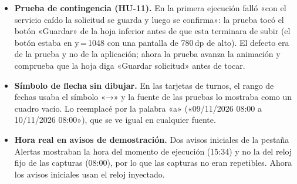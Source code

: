 \begin{itemize}
	\item \textbf{Prueba de contingencia (HU-11).} En la primera ejecución falló «con el servicio caído la solicitud se guarda y luego se confirma»: la prueba tocó el botón «Guardar» de la hoja inferior antes de que esta terminara de subir (el botón estaba en y\,=\,1048 con una pantalla de 780\,dp de alto). El defecto era de la prueba y no de la aplicación; ahora la prueba avanza la animación y comprueba que la hoja diga «Guardar solicitud» antes de tocar.
	\item \textbf{Símbolo de flecha sin dibujar.} En las tarjetas de turnos, el rango de fechas usaba el símbolo «→» y la fuente de las pruebas lo mostraba como un cuadro vacío. Lo reemplacé por la palabra «a» («09/11/2026 08:00 a 10/11/2026 08:00»), que se ve igual en cualquier fuente.
	\item \textbf{Hora real en avisos de demostración.} Dos avisos iniciales de la pestaña Alertas mostraban la hora del momento de ejecución (15:34) y no la del reloj fijo de las capturas (08:00), por lo que las capturas no eran repetibles. Ahora los avisos iniciales usan el reloj inyectado.
\end{itemize}

